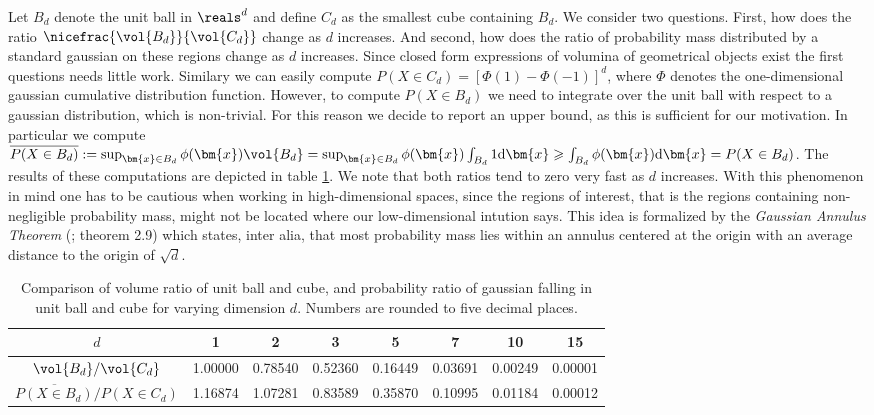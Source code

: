 Let $B_d$ denote the unit ball in $\reals^d$ and define $C_d$ as the smallest cube containing $B_d$.
We consider two questions.
First, how does the ratio $\nicefrac{\vol{B_d}}{\vol{C_d}}$ change as $d$ increases.
And second, how does the ratio of probability mass distributed by a standard gaussian on these regions change as $d$ increases.
Since closed form expressions of volumina of geometrical objects exist the first questions needs little work.
Similary we can easily compute $P(X \in C_d) = \left[\Phi(1) - \Phi(-1)\right]^d$, where $\Phi$ denotes the one-dimensional gaussian cumulative distribution function.
However, to compute $P(X \in B_d)$ we need to integrate over the unit ball with respect to a gaussian distribution, which is non-trivial.
For this reason we decide to report an upper bound, as this is sufficient for our motivation.
In particular we compute $\overline{P(X \in B_d)} := \sup_{\bm{x} \in B_d} \phi(\bm{x}) \vol{B_d} = \sup_{\bm{x} \in B_d} \phi(\bm{x}) \int_{B_d}1 \mathrm{d}\bm{x} \geqslant \int_{B_d} \phi(\bm{x}) \mathrm{d}\bm{x} = P(X \in B_d)$.
The results of these computations are depicted in table \ref{tab:vol_high_dim}.
We note that both ratios tend to zero very fast as $d$ increases.
With this phenomenon in mind one has to be cautious when working in high-dimensional spaces, since the regions of interest, that is the regions containing non-negligible probability mass, might not be located where our low-dimensional intution says.
This idea is formalized by the \emph{Gaussian Annulus Theorem} (\citet{blum2017foundations}; theorem 2.9) which states, inter alia, that most probability mass lies within an annulus centered at the origin with an average distance to the origin of $\sqrt{d}$.

\begin{table}[ht]
\def\arraystretch{1.3}
\centering
 \begin{tabular}{c | c c c c c c c}
 $d$ & 1 & 2 & 3 & 5 & 7 & 10 & 15\\
 \hline
 ${\vol{B_d}} / {\vol{C_d}}$ & 1.00000 & 0.78540 & 0.52360 & 0.16449 & 0.03691 & 0.00249 & 0.00001\\
 ${\overline{P(X \in B_d)}} / {P(X \in C_d)}$ & 1.16874 & 1.07281 & 0.83589 & 0.35870 & 0.10995 & 0.01184 & 0.00012
 \end{tabular}
 \caption{Comparison of volume ratio of unit ball and cube, and probability ratio of gaussian falling in unit ball and cube for varying dimension $d$. Numbers are rounded to five decimal places.}
\label{tab:vol_high_dim}
\end{table}

